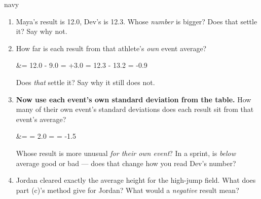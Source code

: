 \begin{scenariobox}{navy}
\vspace{2pt}
\normalsize
\begin{enumerate}[label=\textbf{\alph*.}, leftmargin=1.8em, itemsep=4pt]
  \item Maya's result is 12.0, Dev's is 12.3. Whose \emph{number} is bigger? \blank{2.6cm}
        Does that settle it? Say why not.
        \answerspace{1.4cm}{}
  \item How far is each result from that athlete's \emph{own} event average?
        \begin{work}
         &= 12.0 - 9.0 = +3.0  \qquad
         = 12.3 - 13.2 = -0.9 
        \end{work}
        Does \emph{that} settle it? \blank{2.0cm} Say why it still does not.
        \answerspace{1.4cm}{}
  \item \textbf{Now use each event's own standard deviation from the table.} How many of their
        own event's standard deviations does each result sit from that event's average?
        \begin{work}
         &=  = 2.0 \qquad
         =  = -1.5
        \end{work}
        Whose result is more unusual \emph{for their own event}? In a sprint, is \emph{below}
        average good or bad --- does that change how you read Dev's number?
        \answerspace{2.2cm}{}
  \item Jordan cleared exactly the average height for the high-jump field. What does part (c)'s
        method give for Jordan? \blank{2.0cm} What would a \emph{negative} result mean?
        \answerspace{1.2cm}{}
\end{enumerate}
\end{scenariobox}

